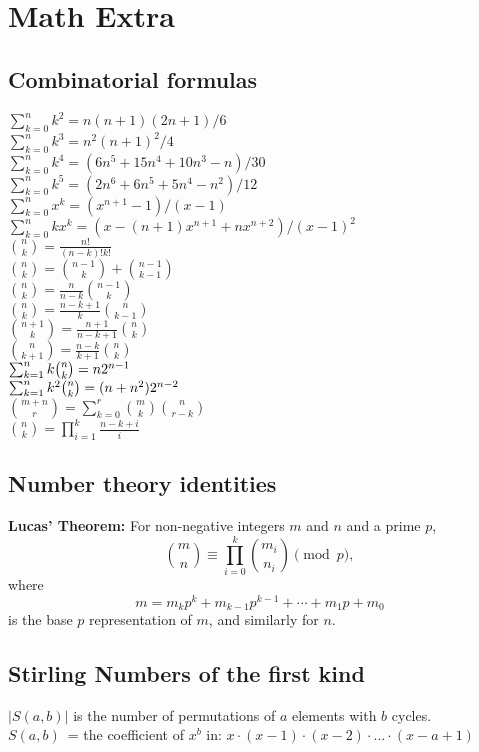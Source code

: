 \section{Math Extra}
\subsection{Combinatorial formulas}
 $\sum_{k=0}^{n}k^{2}=n(n+1)(2n+1)/6$\\
 $\sum_{k=0}^{n}k^{3}=n^{2}(n+1)^{2}/4$\\
 $\sum_{k=0}^{n}k^{4}=(6n^{5}+15n^{4}+10n^{3}-n)/30$\\
 $\sum_{k=0}^{n}k^{5}=(2n^{6}+6n^{5}+5n^{4}-n^{2})/12$\\
 $\sum_{k=0}^{n}x^{k}=(x^{n+1}-1)/(x-1)$\\
 $\sum_{k=0}^{n}kx^{k}=(x-(n+1)x^{n+1}+nx^{n+2})/(x-1)^{2}$\\
 ${n \choose k}=\frac{n!}{(n-k)!k!}$\\
 ${n \choose k}={n-1 \choose k}+{n-1 \choose k-1}$\\
 ${n \choose k}=\frac{n}{n-k}{n-1 \choose k}$\\
 ${n \choose k}=\frac{n-k+1}{k}{n \choose k-1}$\\
 ${n+1 \choose k}=\frac{n+1}{n-k+1}{n \choose k}$\\
 ${n \choose k+1}=\frac{n-k}{k+1}{n \choose k}$\\
 $\sum_{k=1}^{n}k\tbinom{n}{k}=n2^{n-1}$\\
 $\sum_{k=1}^{n}k^{2}\tbinom{n}{k}=(n+n^{2})2^{n-2}$\\
 ${m+n \choose r}=\sum_{k=0}^{r}{m \choose k}{n \choose r-k}$\\
 ${n \choose k}=\prod_{i=1}^{k}\frac{n-k+i}{i}$\\
\vspace{-\baselineskip}
\subsection{Number theory identities}
\textbf{Lucas' Theorem:} For non-negative integers $m$ and $n$ and a prime $p$,
\vspace{-\baselineskip}
$$\binom{m}{n}\equiv\prod_{i=0}^k\binom{m_i}{n_i}\pmod p,$$
where
\vspace{-\baselineskip}
$$m=m_kp^k+m_{k-1}p^{k-1}+\cdots +m_1p+m_0$$
is the base $p$ representation of $m$, and similarly for $n$.

\vspace{-\baselineskip}
\subsection{Stirling Numbers of the first kind}
$|S(a, b)|$ is the number of permutations of $a$ elements with $b$ cycles.\\
$S(a, b)$\ = the coefficient of ${{x}^{b}}$ in: $x\cdot(x - 1)\cdot(x - 2)\cdot...\cdot(x - a + 1)$

